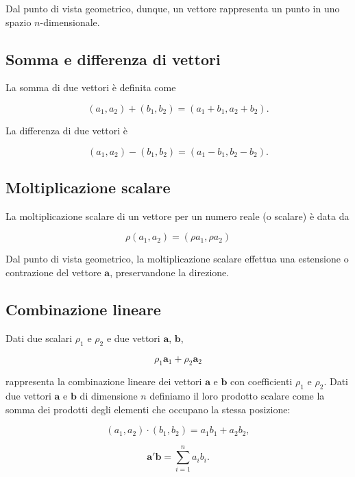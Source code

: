 \documentclass[
  11pt,
]{krantz}
\theoremstyle{definition}
\theoremstyle{definition}
\theoremstyle{definition}
\theoremstyle{definition}
\theoremstyle{remark}
\begin{document}
Dal punto di vista geometrico, dunque, un vettore rappresenta un punto in uno spazio \(n\)-dimensionale.

\hypertarget{somma-e-differenza-di-vettori}{%
\subsection{Somma e differenza di vettori}\label{somma-e-differenza-di-vettori}}

La somma di due vettori è definita come

\[(a_1, a_2) + (b_1, b_2) = (a_1 + b_1, a_2 + b_2).\]

La differenza di due vettori è

\[(a_1, a_2) - (b_1, b_2) = (a_1 - b_1, b_2 - b_2).\]

\hypertarget{moltiplicazione-scalare}{%
\subsection{Moltiplicazione scalare}\label{moltiplicazione-scalare}}

La moltiplicazione scalare di un vettore per un numero reale (o scalare) è data da

\[
\rho (a_1, a_2) = (\rho a_1, \rho a_2)
\]

Dal punto di vista geometrico, la moltiplicazione scalare effettua una estensione o contrazione del vettore \(\boldsymbol{a}\), preservandone la direzione.

\hypertarget{combinazione-lineare}{%
\subsection{Combinazione lineare}\label{combinazione-lineare}}

Dati due scalari \(\rho_1\) e \(\rho_2\) e due vettori \(\boldsymbol{a}\), \(\boldsymbol{b}\),

\[
\rho_1 \boldsymbol{a}_1 + \rho_2 \boldsymbol{a}_2
\]

rappresenta la combinazione lineare dei vettori \(\boldsymbol{a}\) e \(\boldsymbol{b}\) con coefficienti \(\rho_1\) e \(\rho_2\). Dati due vettori \(\boldsymbol{a}\) e \(\boldsymbol{b}\) di dimensione \(n\) definiamo il loro prodotto scalare come la somma dei prodotti degli elementi che occupano la stessa posizione:

\[(a_1, a_2) \cdot (b_1, b_2) = a_1 b_1 + a_2 b_2,\]

\[\boldsymbol{a}'\boldsymbol{b} = \sum_{i=1}^{n}a_i b_i.\]
\end{document}
